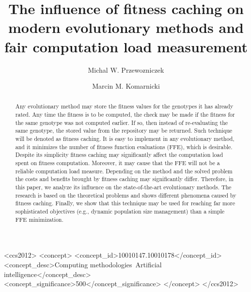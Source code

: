 \documentclass[sigconf]{acmart}
\begin{document}
\title{The influence of fitness caching on modern evolutionary methods and fair computation load measurement}

\author{Michal W. Przewozniczek}

\author{Marcin M. Komarnicki}



\begin{abstract}
	
Any evolutionary method may store the fitness values for the genotypes it has already rated. Any time the fitness is to be computed, the check may be made if the fitness for the same genotype was not computed earlier. If so, then instead of re-evaluating the same genotype, the stored value from the repository may be returned. Such technique will be denoted as fitness caching. It is easy to implement in any evolutionary method, and it minimizes the number of fitness function evaluations (FFE), which is desirable. Despite its simplicity fitness caching may significantly affect the computation load spent on fitness computation. Moreover, it may cause that the FFE will not be a reliable computation load measure. Depending on the method and the solved problem the costs and benefits brought by fitness caching may significantly differ. Therefore, in this paper, we analyze its influence on the state-of-the-art evolutionary methods. The research is based on the theoretical problems and shows different phenomena caused by fitness caching. Finally, we show that this technique may be used for reaching far more sophisticated objectives (e.g., dynamic population size management) than a simple FFE minimization.

\end{abstract}

%
%
 \begin{CCSXML}
	<ccs2012>
		<concept>
			<concept_id>10010147.10010178</concept_id>
			<concept_desc>Computing methodologies~Artificial intelligence</concept_desc>
			<concept_significance>500</concept_significance>
		</concept>
	</ccs2012>
\end{CCSXML}
\end{document}
